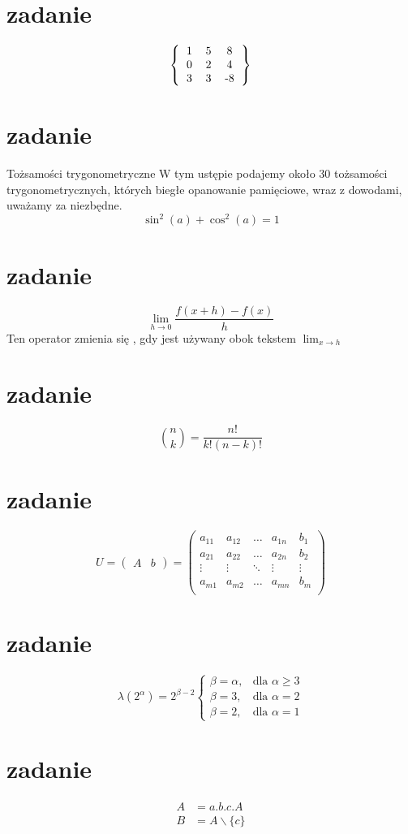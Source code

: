 \documentclass[12pt,b5paper]{article}
\begin{document}
\begin{center}
	\section{zadanie}
		\[\left \{\begin{tabular}{ccc}
			1 & 5 & 8 \\ 0 & 2 & 4 \\ 3 & 3 & -8
		\end{tabular}\right \} \]
	\section{zadanie}
	Tożsamości trygonometryczne	W tym ustępie podajemy około 30 tożsamości trygonometrycznych, których biegłe opanowanie pamięciowe, wraz z dowodami, uważamy za niezbędne.  
		\[\sin^2(a)+\cos^2(a)=1\]
		\section{zadanie}
		\[\lim_{h \rightarrow 0 }\frac{f(x+h)-f(x)}{h}\]
		Ten operator zmienia się , gdy jest używany obok tekstem \(\lim_{x \rightarrow h} \) 
		\section{zadanie}
		\[\binom{n}{k} = \frac{n!}{k!(n-k)!}\]
		\section{zadanie}
		$$
		U = \left(
		\begin{array}{cc} A & b \end{array} \right) =
		\left(\begin{array}{lllll}
			a_{11} & a_{12} & \dots & a_{1n} & b_1 \\
			a_{21} & a_{22} & \dots & a_{2n} & b_2 \\
			\vdots & \vdots & \ddots & \vdots & \vdots \\
			a_{m1} & a_{m2} & \dots & a_{mn} & b_m \\
		\end{array}
		\right)
		$$
		\section{zadanie}
		$$
		\lambda(2^{\alpha}) = 2^{\beta - 2}
			\begin{cases}
			\beta = \alpha, & \text{dla } \alpha \geq 3 \\ \beta = 3, & \text{dla }\alpha = 2\\
			\beta = 2, & \text{dla }\alpha = 1 
			\end{cases} $$  
		\section{zadanie}
		
		\begin{subequations}
			\label{eq:resExamle}
			\begin{align}
				A & = a.b.c.A \label{eq:rese1} \\
				B & = A \backslash \{c\} \label{eq:rese2}
			\end{align}
		\end{subequations}
		
	\end{center} 
\end{document}

